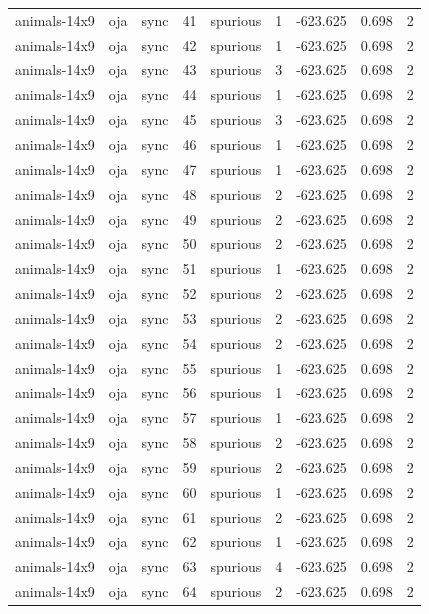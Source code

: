 \begin{tabular}{lllrlrrrr}
animals-14x9 & oja & sync & 41 & spurious & 1 & -623.625 & 0.698 & 2 \\
animals-14x9 & oja & sync & 42 & spurious & 1 & -623.625 & 0.698 & 2 \\
animals-14x9 & oja & sync & 43 & spurious & 3 & -623.625 & 0.698 & 2 \\
animals-14x9 & oja & sync & 44 & spurious & 1 & -623.625 & 0.698 & 2 \\
animals-14x9 & oja & sync & 45 & spurious & 3 & -623.625 & 0.698 & 2 \\
animals-14x9 & oja & sync & 46 & spurious & 1 & -623.625 & 0.698 & 2 \\
animals-14x9 & oja & sync & 47 & spurious & 1 & -623.625 & 0.698 & 2 \\
animals-14x9 & oja & sync & 48 & spurious & 2 & -623.625 & 0.698 & 2 \\
animals-14x9 & oja & sync & 49 & spurious & 2 & -623.625 & 0.698 & 2 \\
animals-14x9 & oja & sync & 50 & spurious & 2 & -623.625 & 0.698 & 2 \\
animals-14x9 & oja & sync & 51 & spurious & 1 & -623.625 & 0.698 & 2 \\
animals-14x9 & oja & sync & 52 & spurious & 2 & -623.625 & 0.698 & 2 \\
animals-14x9 & oja & sync & 53 & spurious & 2 & -623.625 & 0.698 & 2 \\
animals-14x9 & oja & sync & 54 & spurious & 2 & -623.625 & 0.698 & 2 \\
animals-14x9 & oja & sync & 55 & spurious & 1 & -623.625 & 0.698 & 2 \\
animals-14x9 & oja & sync & 56 & spurious & 1 & -623.625 & 0.698 & 2 \\
animals-14x9 & oja & sync & 57 & spurious & 1 & -623.625 & 0.698 & 2 \\
animals-14x9 & oja & sync & 58 & spurious & 2 & -623.625 & 0.698 & 2 \\
animals-14x9 & oja & sync & 59 & spurious & 2 & -623.625 & 0.698 & 2 \\
animals-14x9 & oja & sync & 60 & spurious & 1 & -623.625 & 0.698 & 2 \\
animals-14x9 & oja & sync & 61 & spurious & 2 & -623.625 & 0.698 & 2 \\
animals-14x9 & oja & sync & 62 & spurious & 1 & -623.625 & 0.698 & 2 \\
animals-14x9 & oja & sync & 63 & spurious & 4 & -623.625 & 0.698 & 2 \\
animals-14x9 & oja & sync & 64 & spurious & 2 & -623.625 & 0.698 & 2 \\

\end{tabular}
